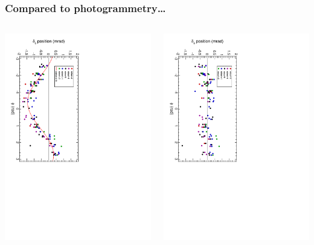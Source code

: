 \documentclass[compress]{beamer}
\begin{document}
\begin{frame}
\frametitle{Compared to photogrammetry\ldots}

\begin{columns}
\mbox{\hspace{0.5 cm}\includegraphics[height=\linewidth, angle=90]{final_vs_PG09_phi.pdf}}

\mbox{\hspace{0.5 cm}\includegraphics[height=\linewidth, angle=90]{final_vs_PG09barrelplus_phi.pdf}}


\end{columns}
\end{frame}
\end{document}
